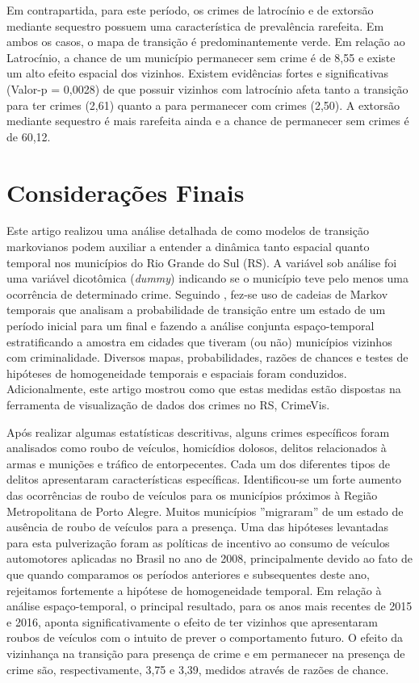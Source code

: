 \documentclass[12pt,openright,oneside,a4paper,english,french,spanish]{abntex2}
\numberwithin{table}{section} %
\numberwithin{figure}{section} %
\newcommand{\co}{\citeonline}
\begin{document}
Em contrapartida, para este período, os crimes de latrocínio e de extorsão mediante sequestro possuem uma característica de prevalência rarefeita. Em ambos os casos, o mapa de transição é predominantemente verde. Em relação ao Latrocínio, a chance de um município permanecer sem crime é de 8,55 e existe um alto efeito espacial dos vizinhos. Existem evidências fortes e significativas (Valor-p = 0,0028) de que possuir vizinhos com latrocínio afeta tanto a transição para ter crimes (2,61) quanto a para permanecer com crimes (2,50). A extorsão mediante sequestro é mais rarefeita ainda e a chance de permanecer sem crimes é de 60,12.


\section{Considerações Finais\label{sec:consideracoes_finais_acoplamento}}

Este artigo realizou uma análise detalhada de como modelos de transição markovianos podem auxiliar a entender a dinâmica tanto espacial quanto temporal nos municípios do Rio Grande do Sul (RS). A variável sob análise foi uma variável dicotômica (\textit{dummy}) indicando se o município teve pelo menos uma ocorrência de determinado crime. Seguindo \co{rey2012exploratory}, fez-se uso de cadeias de Markov temporais que analisam a probabilidade de transição entre um estado de um período inicial para um final e fazendo a análise conjunta espaço-temporal estratificando a amostra em cidades que tiveram (ou não) municípios vizinhos com criminalidade. Diversos mapas, probabilidades, razões de chances e testes de hipóteses de homogeneidade temporais e espaciais foram conduzidos. Adicionalmente, este artigo mostrou como que estas medidas estão dispostas na ferramenta de visualização de dados dos crimes no RS, CrimeVis.

Após realizar algumas estatísticas descritivas, alguns crimes específicos foram analisados como roubo de veículos, homicídios dolosos, delitos relacionados à armas e munições e tráfico de entorpecentes. Cada um dos diferentes tipos de delitos apresentaram características específicas. Identificou-se um forte aumento das ocorrências de roubo de veículos para os municípios próximos à Região Metropolitana de Porto Alegre. Muitos municípios ''migraram'' de um estado de ausência de roubo de veículos para a presença. Uma das hipóteses levantadas para esta pulverização foram as políticas de incentivo ao consumo de veículos automotores aplicadas no Brasil no ano de 2008, principalmente devido ao fato de que quando comparamos os períodos anteriores e subsequentes deste ano, rejeitamos fortemente a hipótese de homogeneidade temporal. Em relação à análise espaço-temporal, o principal resultado, para os anos mais recentes de 2015 e 2016, aponta significativamente o efeito de ter vizinhos que apresentaram roubos de veículos com o intuito de prever o comportamento futuro. O efeito da vizinhança na transição para presença de crime e em permanecer na presença de crime são, respectivamente, 3,75 e 3,39, medidos através de razões de chance.
\end{document}
